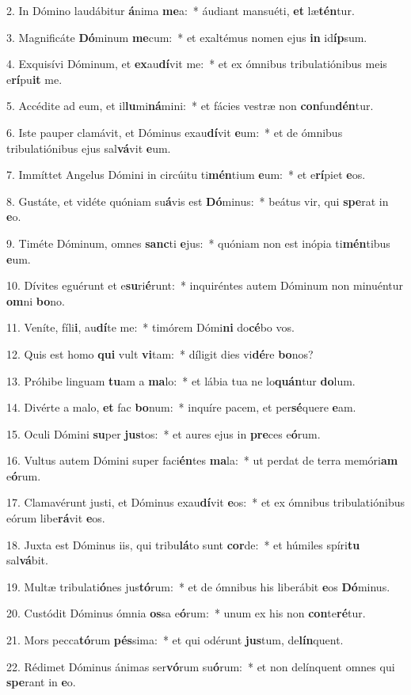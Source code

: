 2. In Dómino laudábitur \textbf{á}nima \textbf{me}a:~*  áudiant mansuéti, \textbf{et} læ\textbf{tén}tur.\

3. Magnificáte \textbf{Dó}minum \textbf{me}cum:~*  et exaltémus nomen ejus \textbf{in} id\textbf{íp}sum.\

4. Exquisívi Dóminum, et \textbf{ex}au\textbf{dí}vit me:~*  et ex ómnibus tribulatiónibus meis e\textbf{rí}pu\textbf{it} me.\

5. Accédite ad eum, et il\textbf{lu}mi\textbf{ná}mini:~*  et fácies vestræ non \textbf{con}fun\textbf{dén}tur.\

6. Iste pauper clamávit, et Dóminus exau\textbf{dí}vit \textbf{e}um:~*  et de ómnibus tribulatiónibus ejus sal\textbf{vá}vit \textbf{e}um.\

7. Immíttet Angelus Dómini in circúitu ti\textbf{mén}tium \textbf{e}um:~*  et e\textbf{rí}piet \textbf{e}os.\

8. Gustáte, et vidéte quóniam su\textbf{á}vis est \textbf{Dó}minus:~*  beátus vir, qui \textbf{spe}rat in \textbf{e}o.\

9. Timéte Dóminum, omnes \textbf{sanc}ti \textbf{e}jus:~*  quóniam non est inópia ti\textbf{mén}tibus \textbf{e}um.\

10. Dívites eguérunt et e\textbf{su}ri\textbf{é}runt:~*  inquiréntes autem Dóminum non minuéntur \textbf{om}ni \textbf{bo}no.\

11. Veníte, fíli\textbf{i}, au\textbf{dí}te me:~*  timórem Dómi\textbf{ni} do\textbf{cé}bo vos.\

12. Quis est homo \textbf{qui} vult \textbf{vi}tam:~*  díligit dies vi\textbf{dé}re \textbf{bo}nos?\

13. Próhibe linguam \textbf{tu}am a \textbf{ma}lo:~*  et lábia tua ne lo\textbf{quán}tur \textbf{do}lum.\

14. Divérte a malo, \textbf{et} fac \textbf{bo}num:~*  inquíre pacem, et per\textbf{sé}quere \textbf{e}am.\

15. Oculi Dómini \textbf{su}per \textbf{jus}tos:~*  et aures ejus in \textbf{pre}ces e\textbf{ó}rum.\

16. Vultus autem Dómini super faci\textbf{én}tes \textbf{ma}la:~*  ut perdat de terra memóri\textbf{am} e\textbf{ó}rum.\

17. Clamavérunt justi, et Dóminus exau\textbf{dí}vit \textbf{e}os:~*  et ex ómnibus tribulatiónibus eórum libe\textbf{rá}vit \textbf{e}os.\

18. Juxta est Dóminus iis, qui tribu\textbf{lá}to sunt \textbf{cor}de:~*  et húmiles spíri\textbf{tu} sal\textbf{vá}bit.\

19. Multæ tribulati\textbf{ó}nes jus\textbf{tó}rum:~*  et de ómnibus his liberábit \textbf{e}os \textbf{Dó}minus.\

20. Custódit Dóminus ómnia \textbf{os}sa e\textbf{ó}rum:~*  unum ex his non \textbf{con}te\textbf{ré}tur.\

21. Mors pecca\textbf{tó}rum \textbf{pés}sima:~*  et qui odérunt \textbf{jus}tum, de\textbf{lín}quent.\

22. Rédimet Dóminus ánimas ser\textbf{vó}rum su\textbf{ó}rum:~*  et non delínquent omnes qui \textbf{spe}rant in \textbf{e}o.\

